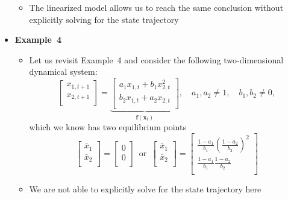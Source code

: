\documentclass[12pt,a4paper]{article}
\begin{document}
\begin{itemize}
\begin{itemize}
  \item The linearized model allows us to reach the same conclusion
    without explicitly solving for the state trajectory
  \end{itemize}

\item \textbf{Example~4}
  \begin{itemize}
  \item Let us revisit Example~4 and consider the following two-dimensional dynamical system:
    \begin{equation}\nonumber%
      \begin{bmatrix}
        x_{1,t+1} \\
        x_{2,t+1} \\
      \end{bmatrix}
      =
      \underbrace{
      \begin{bmatrix}
      a_{1} x_{1,t} + b_{1}x_{2,t}^{2} \\
      b_{2}x_{1,t} + a_{2} x_{2,t} \\
      \end{bmatrix}}_{\bm{f}(\bm{x}_{t})},
      \quad a_{1},a_{2}\neq 1,
      \quad b_{1},b_{2}\neq 0,
    \end{equation}
    which we know has two equilibrium points
    \begin{equation}\nonumber%
      \begin{bmatrix}
        \bar{x}_{1} \\
        \bar{x}_{2} \\
      \end{bmatrix}
      = 
      \begin{bmatrix}
        0 \\
        0 \\
      \end{bmatrix}
      \,\text{ or }\,
      \begin{bmatrix}
        \bar{x}_{1} \\
        \bar{x}_{2} \\
      \end{bmatrix}
      = 
      \begin{bmatrix}
        \frac{1-a_{1}}{b_{1}}\left(\frac{1-a_{2}}{b_{2}}\right)^{2} \\
        \frac{1-a_{1}}{b_{1}}\frac{1-a_{2}}{b_{2}} \\
      \end{bmatrix}
    \end{equation}
  \item We are not able to explicitly solve for the state trajectory here

\end{itemize}
\end{itemize}
\end{document}
